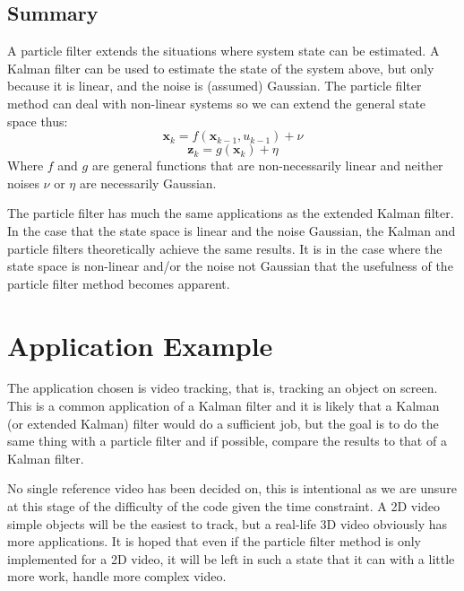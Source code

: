 \documentclass[11pt]{article}
\begin{document}

\subsection{Summary}
A particle filter extends the situations where system state can be estimated. A
Kalman filter can be used to estimate the state of the system above, but only
because it is linear, and the noise is (assumed) Gaussian. The particle filter
method can deal with non-linear systems so we can extend the general state
space thus:
\begin{equation}
\mathbf{x}_{k} = f(\mathbf{x}_{k-1}, u_{k-1}) + \nu
\end{equation}
\begin{equation}
\mathbf{z}_{k} = g(\mathbf{x}_{k}) + \eta
\end{equation}
Where $f$ and $g$ are general functions that are non-necessarily linear and
neither noises $\nu$ or $\eta$ are necessarily Gaussian.

The particle filter has much the same applications as the extended Kalman
filter. In the case that the state space is linear and the noise Gaussian, the
Kalman and particle filters theoretically achieve the same results. It is in
the case where the state space is non-linear and/or the noise not Gaussian that
the usefulness of the particle filter method becomes apparent.

\section{Application Example}\label{sec:application}
The application chosen is video tracking, that is, tracking an object on screen.
This is a common application of a Kalman filter and it is likely that a Kalman
(or extended Kalman) filter would do a sufficient job, but the goal is to do the
same thing with a particle filter and if possible, compare the results to that
of a Kalman filter.

No single reference video has been decided on, this is intentional as we are
unsure at this stage of the difficulty of the code given the time constraint. A
2D video simple objects will be the easiest to track, but a real-life 3D video
obviously has more applications. It is hoped that even if the particle filter
method is only implemented for a 2D video, it will be left in such a state that
it can with a little more work, handle more complex video.
\end{document}
